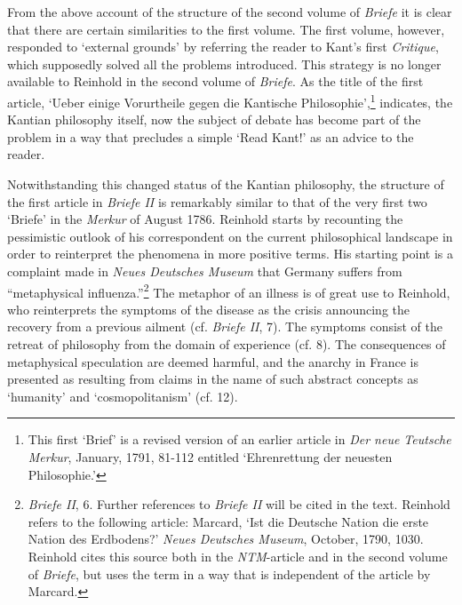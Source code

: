  From the above account of the structure of the second volume of \textit{Briefe} it is clear that there are certain similarities to the first volume. The first volume, however, responded to `external grounds' by referring the reader to Kant's first \textit{Critique}, which supposedly solved all the problems introduced. This strategy is no longer available to Reinhold in the second volume of \textit{Briefe}. As the title of the first article, `Ueber einige Vorurtheile gegen die Kantische Philosophie',\footnote{\label{footnote:_Ref233181041} This first `Brief' is a revised version of an earlier article in \textit{Der neue Teutsche Merkur}, January, 1791, 81{-}112 entitled `Ehrenrettung der neuesten Philosophie.' } indicates, the Kantian philosophy itself, now the subject of debate has become part of the problem in a way that precludes a simple `Read Kant!' as an advice to the reader. 

Notwithstanding this changed status of the Kantian philosophy, the structure of the first article in \textit{Briefe II} is remarkably similar to that of the very first two `Briefe' in the \textit{Merkur} of August 1786. Reinhold starts by recounting the pessimistic outlook of his correspondent on the current philosophical landscape in order to reinterpret the phenomena in more positive terms. His starting point is a complaint made in \textit{Neues Deutsches Museum} that Germany suffers from ``metaphysical influenza.''\footnote{\textit{ Briefe II}, 6. Further references to \textit{Briefe II} will be cited in the text. Reinhold refers to the following article: Marcard, `Ist die Deutsche Nation die erste Nation des Erdbodens?' \textit{Neues Deutsches Museum}, October, 1790, 1030. Reinhold cites this source both in the \textit{NTM}{-}article and in the second volume of \textit{Briefe}, but uses the term in a way that is independent of the article by Marcard. } The metaphor of an illness is of great use to Reinhold, who reinterprets the symptoms of the disease as the crisis announcing the recovery from a previous ailment (cf.\textit{ Briefe II}, 7). The symptoms consist of the retreat of philosophy from the domain of experience (cf. 8). The consequences of metaphysical speculation are deemed harmful, and the anarchy in France is presented as resulting from claims in the name of such abstract concepts as `humanity' and `cosmopolitanism' (cf. 12). 

